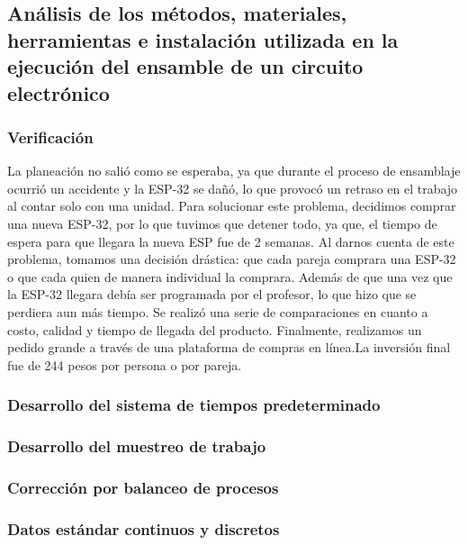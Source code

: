 

\subsection{Análisis de los métodos, materiales, herramientas e instalación utilizada en la ejecución del ensamble de un circuito electrónico}

\subsubsection{Verificación}

La planeación no salió como se esperaba, ya que durante el proceso de ensamblaje ocurrió un accidente y la ESP-32 se dañó, lo que provocó un retraso en el trabajo al contar solo con una unidad. Para solucionar este problema, decidimos comprar una nueva ESP-32, por lo que tuvimos que detener todo, ya que, el tiempo de espera para que llegara la nueva ESP fue de 2 semanas. Al darnos cuenta de este problema, tomamos una decisión drástica: que cada pareja comprara una ESP-32 o que cada quien de manera individual la comprara. Además de que una vez que la ESP-32 llegara debía ser programada por el profesor, lo que hizo que se perdiera aun más tiempo. Se realizó una serie de comparaciones en cuanto a costo, calidad y tiempo de llegada del producto. Finalmente, realizamos un pedido grande a través de una plataforma de compras en línea.La inversión final fue de 244 pesos por persona o por pareja.
%
%
\subsubsection{Desarrollo del sistema de tiempos predeterminado}

\subsubsection{Desarrollo del muestreo de trabajo}

\subsubsection{Corrección por balanceo de procesos}


\subsubsection{Datos estándar continuos y discretos}
%
%
